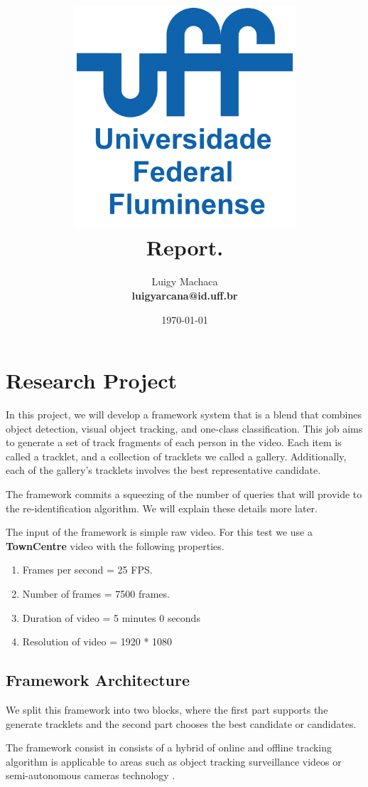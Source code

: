 \documentclass[a4paper]{article}
\title{
    \vspace*{1in}
    \includegraphics[width=3.25in]{figures/uff-logo.png} \\
    \vspace*{1.2in}
    \textbf{\huge Report.}
    \vspace{0.2in}\\
    \vspace{0.2in}
}
\author{Luigy Machaca \\
    \textbf{luigyarcana@id.uff.br} \\
}
\date{\today}
\begin{document}
\maketitle
\setcounter{page}{0}
\thispagestyle{empty}
\newpage


\section{Research Project}
In this project, we will develop a framework system that is a blend that combines object detection, visual object tracking, and one-class classification. This job aims to generate a set of track fragments of each person in the video. Each item is called a tracklet, and a collection of tracklets we called a gallery. Additionally, each of the gallery's tracklets involves the best representative candidate.

The framework commits a squeezing of the number of queries that will provide to the re-identification algorithm. We will explain these details more later.

The input of the framework is simple raw video. For this test we use a \textbf{TownCentre} video with the following properties.
\begin{enumerate}
    \item Frames per second = 25 FPS.
    \item Number of frames = 7500 frames.
    
    \item Duration of video = 5 minutes 0 seconds
    \item Resolution of video = 1920 * 1080
\end{enumerate}

\subsection{Framework Architecture}

We split this framework into two blocks, where the first part supports the generate tracklets and the second part chooses the best candidate or candidates. 









The framework consist in consists of a hybrid of online and offline tracking algorithm is applicable to areas such as object tracking surveillance videos or semi-autonomous cameras technology \cite{re3}.
\end{document}
